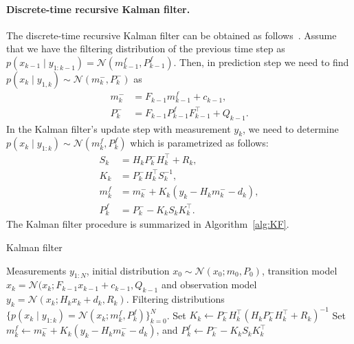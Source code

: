 \documentclass[dissertation,math,vertlayout,pdfa,colorlinks,nologo]{aaltoseries}
\begin{document}
\paragraph{\textbf{Discrete-time recursive Kalman filter.}} The discrete-time recursive Kalman filter can be obtained as follows~\citep[Theorem 6.6]{sarkka2023bayesian}. Assume that we have the filtering distribution of the previous time step as $p(x_{k-1} \mid y_{1: k - 1}) = \mathcal{N}(m^f_{k-1}, P^f_{k-1})$. Then, in prediction step we need to find $p(x_{k} \mid y_{1, k}) \sim \mathcal{N}(m_{k}^-, P_{k}^-)$ as
    \begin{equation} \label{eq:affine-model-prediction}
        \begin{split}
            m_{k}^- &= F_{k-1} m^f_{k-1} + c_{k-1}, \\
            P_{k}^- &= F_{k-1} P^f_{k-1} F^\top_{k-1} + Q_{k-1}.
        \end{split}
    \end{equation}
In the Kalman filter's update step with measurement $y_{k}$, we need to determine $p(x_{k} \mid y_{1:k}) \sim \mathcal{N}( m^f_{k}, P^f_{k})$ which is parametrized as follows:
    \begin{equation} \label{eq:affine-model-update}
        \begin{split}
            S_k & = H_k P_{k}^- H_k^\top + R_k,\\
            K_k &=  P_{k}^- H_k^\top S_k^{-1},\\
            m^f_{k} &= m_{k}^- + K_k (y_{k} - H_k m^-_{k} - d_k ),\\
            P^f_{k} &= P_{k}^- - K_k S_k K_k^\top.
        \end{split}
    \end{equation}
The Kalman filter procedure is summarized in Algorithm~\ref{alg:KF}.
\begin{algorithm}[!htb]
    \caption{Kalman filter}\label{alg:KF}
    \begin{algorithmic}[1]
        \renewcommand{\algorithmicrequire}{\textbf{Input:}}
        \renewcommand{\algorithmicensure}{\textbf{Output:}}
        \REQUIRE Measurements $y_{1:N}$, initial distribution $x_0 \sim \mathcal{N}(x_0; m_0, P_0)$, transition model $x_k = \mathcal{N}(x_k; F_{k-1} x_{k-1} + c_{k-1} , Q_{k-1}$ and observation model $y_k =  \mathcal{N}(x_k; H_k x_k + d_k,  R_k)$.
        \ENSURE Filtering distributions $\big\{p(x_k \mid y_{1: k})  = \mathcal{N}(x_k; m^f_k, P^f_k)\big\}_{k = 0}^N$.
        \STATE {}
            \STATE {}
            \STATE  Set $
            K_k \gets  P_{k}^- H_k^\top (H_k P_{k}^- H_k^\top + R_k)^{-1}$
             \STATE Set $ m^f_{k} \gets m_{k}^- + K_k (y_{k} - H_k m^-_{k} - d_k ) $, and $P^f_{k} \gets P_{k}^- - K_k S_k K_k^\top$
        \ENDFOR
    \end{algorithmic}
\end{algorithm}
\end{document}
